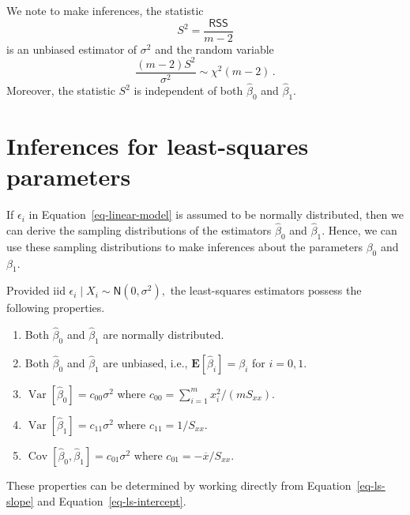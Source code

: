 \documentclass[
  a4paper,
  DIV=11,
  numbers=noendperiod,
  oneside]{scrreprt}
\providecommand{\tightlist}{%
  \setlength{\itemsep}{0pt}\setlength{\parskip}{0pt}}
\theoremstyle{definition}
\theoremstyle{definition}
\theoremstyle{plain}
\theoremstyle{plain}
\theoremstyle{definition}
\theoremstyle{remark}
\begin{document}
We note to make inferences, the statistic \[
 S^2 = \frac{\mathsf{RSS}}{m-2}
\] is an unbiased estimator of \(\sigma^2\) and the random variable \[
 \frac{(m-2) S^2}{\sigma^2} \sim \chi^2(m-2)\,.
\] Moreover, the statistic \(S^2\) is independent of both
\(\widehat{\beta}_0\) and \(\widehat{\beta}_1.\)

\section{Inferences for least-squares
parameters}\label{sec-inference-ls}

If \(\epsilon_i\) in Equation~\ref{eq-linear-model} is assumed to be
normally distributed, then we can derive the sampling distributions of
the estimators \(\widehat{\beta}_0\) and \(\widehat{\beta}_1.\) Hence,
we can use these sampling distributions to make inferences about the
parameters \(\beta_0\) and \(\beta_1.\)

Provided iid \(\epsilon_i \mid X_i \sim \mathsf{N}(0, \sigma^2),\) the
least-squares estimators possess the following properties.

\begin{enumerate}
\def\labelenumi{\arabic{enumi}.}
\tightlist
\item
  Both \(\widehat{\beta}_0\) and \(\widehat{\beta}_1\) are normally
  distributed.
\item
  Both \(\widehat{\beta}_0\) and \(\widehat{\beta}_1\) are unbiased,
  i.e., \(\mathbf{E}[\widehat{\beta}_i] = \beta_i\) for \(i = 0,1.\)
\item
  \(\mathop{\mathrm{Var}}[\widehat{\beta}_0] = c_{00} \sigma^2\) where
  \(c_{00} = \sum_{i=1}^m x_i^2 / (m S_{xx}).\)
\item
  \(\mathop{\mathrm{Var}}[\widehat{\beta}_1] = c_{11} \sigma^2\) where
  \(c_{11} = 1/S_{xx}.\)
\item
  \(\mathop{\mathrm{Cov}}[\widehat{\beta}_0, \widehat{\beta}_1] = c_{01} \sigma^2\)
  where \(c_{01} = - \overline{x} / S_{xx}.\)
\end{enumerate}

These properties can be determined by working directly from
Equation~\ref{eq-ls-slope} and Equation~\ref{eq-ls-intercept}.
\end{document}
